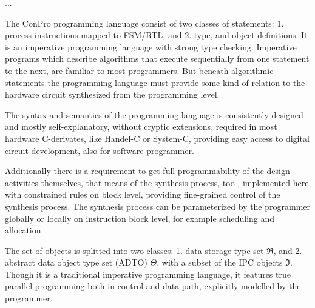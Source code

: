 \documentclass[a4paper,12pt,twoside,english]{article}
\begin{document}
\vskip5pt



\def\thesubsubsection{\vrule width 0pt height 1.3 ex}

\def\thesubsection{\tocV}
\secII{\label{toclabelV}\thesubsection}
...


\vskip5pt


\vskip10pt
\def\thesubsubsection{\vrule width 0pt height 1.3 ex}

\def\thesubsection{\vrule width 0pt height 1.3 ex}

\def\thesection{\tocVI}
\secI{\label{toclabelVI}3\hfill\thesection}
\def\thesubsubsection{\vrule width 0pt height 1.3 ex}

\def\thesubsection{\tocVII}
\secII{\label{toclabelVII}\thesubsection}
The ConPro programming language consist of two classes of statements: 1. process instructions mapped to
FSM/RTL, and 2. type, and object definitions. It is an imperative programming language with strong type checking. Imperative programs which describe algorithms
that execute sequentially from one statement to the next, are familiar to most programmers. But beneath algorithmic statements the programming language must
provide some kind of relation to the hardware circuit synthesized from the programming level.


\vskip5pt
The syntax and semantics of the programming language is consistently designed and mostly self-explanatory, without cryptic extensions, required in most hardware
C-derivates, like Handel-C or System-C, providing easy access to digital circuit development, also for software programmer.


\vskip5pt
Additionally there is a requirement to get full programmability of the design activities themselves, that means of the synthesis process, too ,  implemented here with constrained rules on block level, providing fine-grained control of the synthesis process. The synthesis
process can be parameterized by the programmer globally or locally on instruction block level, for example scheduling and allocation.


\vskip5pt
The set of objects is splitted into two classes: 1. data storage type set $\Re$, and 2. abstract data object type set (ADTO) $\Theta$, with a subset of  the IPC
objects $\Im$. Though it is a traditional imperative programming language, it features true parallel programming both in control and data path, explicitly
modelled by the programmer. 
\end{document}
